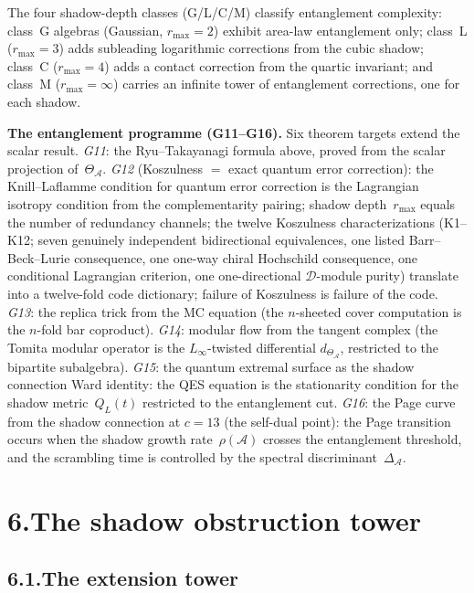 \documentclass[11pt]{report}
\theoremstyle{definition}
\theoremstyle{remark}
\providecommand{\cA}{\mathcal{A}}
\numberwithin{equation}{section}
\begin{document}
The four shadow-depth classes (G/L/C/M) classify entanglement
complexity: class~G algebras (Gaussian, $r_{\max}=2$) exhibit
area-law entanglement only; class~L ($r_{\max}=3$) adds subleading
logarithmic corrections from the cubic shadow; class~C
($r_{\max}=4$) adds a contact correction from the quartic
invariant; and class~M ($r_{\max}=\infty$) carries an infinite tower
of entanglement corrections, one for each shadow.

\medskip
\noindent\textbf{The entanglement programme (G11--G16).}\enspace
Six theorem targets extend the scalar result.
\emph{G11}: the Ryu--Takayanagi formula above, proved from the
scalar projection of~$\Theta_\cA$.
\emph{G12} (Koszulness $=$ exact quantum error correction): the
Knill--Laflamme condition for quantum error correction is the
Lagrangian isotropy condition from the complementarity pairing;
shadow depth~$r_{\max}$ equals the number of redundancy channels;
the twelve Koszulness characterizations (K1--K12; seven
genuinely independent bidirectional equivalences, one listed
Barr--Beck--Lurie consequence, one one-way chiral Hochschild
consequence, one conditional Lagrangian criterion, one
one-directional $\mathcal{D}$-module purity) translate into a
twelve-fold code dictionary; failure of Koszulness is failure of
the code.
\emph{G13}: the replica trick from the MC equation (the
$n$-sheeted cover computation is the $n$-fold bar coproduct).
\emph{G14}: modular flow from the tangent complex (the Tomita
modular operator is the $L_\infty$-twisted differential
$d_{\Theta_\cA}$, restricted to the bipartite subalgebra).
\emph{G15}: the quantum extremal surface as the shadow
connection Ward identity: the QES equation is the stationarity
condition for the shadow metric~$Q_L(t)$ restricted to the
entanglement cut.
\emph{G16}: the Page curve from the shadow connection at $c = 13$
(the self-dual point): the Page transition occurs when the
shadow growth rate~$\rho(\cA)$ crosses the entanglement
threshold, and the scrambling time is controlled by the
spectral discriminant~$\Delta_\cA$.

\section*{6.\quad The shadow obstruction tower}

\subsection*{6.1.\enspace The extension tower}
\end{document}
